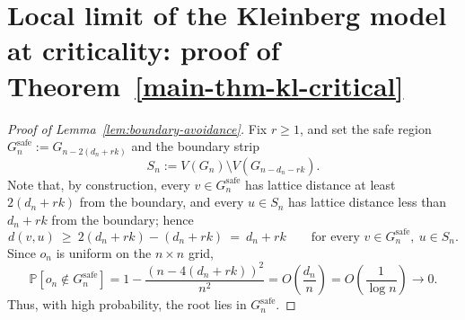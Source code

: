 \documentclass[10pt]{amsart}
\begin{document}
\section{Local limit of the Kleinberg model at criticality: proof of Theorem~\ref{main-thm-kl-critical}}
\label{proof-main-thm-kl-critical-appendix}


\begin{proof}[Proof of Lemma~\ref{lem:boundary-avoidance}]
   Fix $r\ge 1$, and set the safe region
  $G_n^{\mathrm{safe}}:=G_{n-2(d_n+rk)}$ and the boundary strip
  \[
  S_n:=V(G_n)\setminus V(G_{n-d_n-rk}).
  \]
  Note that, by construction, every $v\in G_n^{\mathrm{safe}}$ has
  lattice distance at least $2(d_n+rk)$ from the boundary, and every
  $u\in S_n$ has lattice distance less than $d_n+rk$ from the boundary;
  hence
  \[
  d(v,u)\ \ge\ 2(d_n+rk)-(d_n+rk)\ =\ d_n+rk
  \qquad\text{for every }v\in G_n^{\mathrm{safe}},\ u\in S_n.
  \]
  Since $o_n$ is uniform on the $n\times n$ grid,
  \[
  \mathbb P[o_n\notin G_n^{\mathrm{safe}}]
  = 1-\frac{(n-4(d_n+rk))^2}{n^2}
  = O\!\left(\frac{d_n}{n}\right)
  = O\!\left(\frac1{\log n}\right)\to 0.
  \]
  Thus, with high probability, the root lies in $G_n^{\mathrm{safe}}$.





\end{proof}
\end{document}
